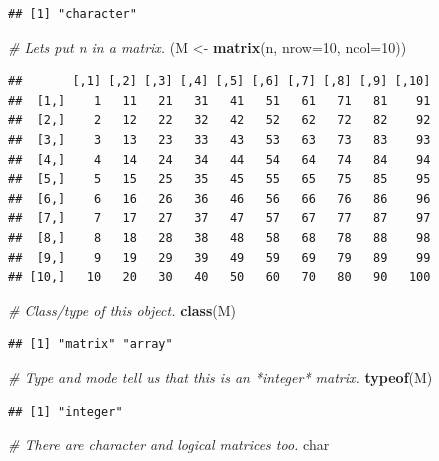 \documentclass[
]{book}
\newenvironment{Shaded}{\begin{snugshade}}{\end{snugshade}}
\newcommand{\AttributeTok}[1]{\textcolor[rgb]{0.13,0.29,0.53}{#1}}
\newcommand{\CommentTok}[1]{\textcolor[rgb]{0.56,0.35,0.01}{\textit{#1}}}
\newcommand{\DecValTok}[1]{\textcolor[rgb]{0.00,0.00,0.81}{#1}}
\newcommand{\FunctionTok}[1]{\textcolor[rgb]{0.13,0.29,0.53}{\textbf{#1}}}
\newcommand{\NormalTok}[1]{#1}
\newcommand{\OtherTok}[1]{\textcolor[rgb]{0.56,0.35,0.01}{#1}}
\begin{document}
\begin{verbatim}
## [1] "character"
\end{verbatim}

\begin{Shaded}
\begin{Highlighting}[]
\CommentTok{\# Let\textquotesingle{}s put n in a matrix.}
\NormalTok{(M }\OtherTok{\textless{}{-}} \FunctionTok{matrix}\NormalTok{(n, }\AttributeTok{nrow=}\DecValTok{10}\NormalTok{, }\AttributeTok{ncol=}\DecValTok{10}\NormalTok{))}
\end{Highlighting}
\end{Shaded}

\begin{verbatim}
##       [,1] [,2] [,3] [,4] [,5] [,6] [,7] [,8] [,9] [,10]
##  [1,]    1   11   21   31   41   51   61   71   81    91
##  [2,]    2   12   22   32   42   52   62   72   82    92
##  [3,]    3   13   23   33   43   53   63   73   83    93
##  [4,]    4   14   24   34   44   54   64   74   84    94
##  [5,]    5   15   25   35   45   55   65   75   85    95
##  [6,]    6   16   26   36   46   56   66   76   86    96
##  [7,]    7   17   27   37   47   57   67   77   87    97
##  [8,]    8   18   28   38   48   58   68   78   88    98
##  [9,]    9   19   29   39   49   59   69   79   89    99
## [10,]   10   20   30   40   50   60   70   80   90   100
\end{verbatim}

\begin{Shaded}
\begin{Highlighting}[]
\CommentTok{\# Class/type of this object.}
\FunctionTok{class}\NormalTok{(M)}
\end{Highlighting}
\end{Shaded}

\begin{verbatim}
## [1] "matrix" "array"
\end{verbatim}

\begin{Shaded}
\begin{Highlighting}[]
\CommentTok{\# Type and mode tell us that this is an *integer* matrix.}
\FunctionTok{typeof}\NormalTok{(M)}
\end{Highlighting}
\end{Shaded}

\begin{verbatim}
## [1] "integer"
\end{verbatim}

\begin{Shaded}
\begin{Highlighting}[]
\CommentTok{\# There are character and logical matrices too.}
\NormalTok{char}
\end{Highlighting}
\end{Shaded}
\end{document}
